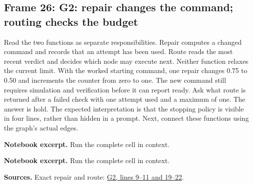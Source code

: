 \documentclass[11pt]{article}
\begin{document}
\subsection*{Frame 26: G2: repair changes the command; routing checks the budget}
Read the two functions as separate responsibilities. Repair computes a changed command and records that an attempt has been used. Route reads the most recent verdict and decides which node may execute next. Neither function relaxes the current limit. With the worked starting command, one repair changes 0.75 to 0.50 and increments the counter from zero to one. The new command still requires simulation and verification before it can report ready. Ask what route is returned after a failed check with one attempt used and a maximum of one. The answer is hold. The expected interpretation is that the stopping policy is visible in four lines, rather than hidden in a prompt. Next, connect these functions using the graph's actual edges.\par
\par\noindent\begin{minipage}{\linewidth}\textbf{Notebook excerpt.} Run the complete cell in context.\par \end{minipage}\par
\par\noindent\begin{minipage}{\linewidth}\textbf{Notebook excerpt.} Run the complete cell in context.\par \end{minipage}\par
\par\nopagebreak\begin{minipage}{\linewidth}{\footnotesize\color{slate}\textbf{Sources.} Exact repair and route: \href{../Graph_Workflow_Lab.ipynb}{G2, lines 9--11 and 19--22}.\par}\end{minipage}\par\medskip
\end{document}
